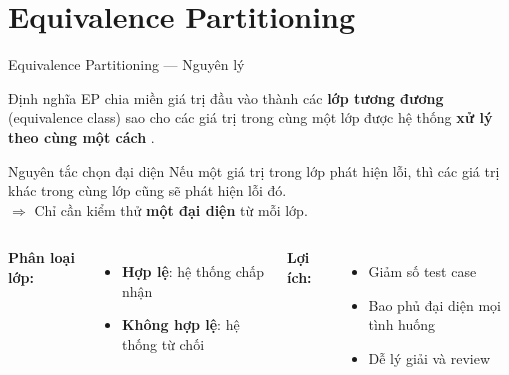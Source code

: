 \documentclass[aspectratio=169,12pt]{beamer}
\begin{document}
\section{Equivalence Partitioning}

\begin{frame}[shrink=10]{Equivalence Partitioning --- Nguyên lý}
  \begin{block}{Định nghĩa}
    EP chia miền giá trị đầu vào thành các \textbf{lớp tương đương}
    (equivalence class) sao cho các giá trị trong cùng một lớp
    được hệ thống \textbf{xử lý theo cùng một cách} \cite{istqb-ctfl,myers-testing}.
  \end{block}

  \vspace{0.2em}
  \begin{block}{Nguyên tắc chọn đại diện}
    Nếu một giá trị trong lớp phát hiện lỗi, thì các giá trị khác
    trong cùng lớp cũng sẽ phát hiện lỗi đó.\\[0.1em]
    $\Rightarrow$ Chỉ cần kiểm thử \textbf{một đại diện} từ mỗi lớp.
  \end{block}

  \vspace{0.15em}
  \small
  \begin{columns}[T,totalwidth=\textwidth]
    \textbf{Phân loại lớp:}
    \begin{itemize}
      \item \textbf{Hợp lệ}: hệ thống chấp nhận
      \item \textbf{Không hợp lệ}: hệ thống từ chối
    \end{itemize}

    \textbf{Lợi ích:}
    \begin{itemize}
      \item Giảm số test case
      \item Bao phủ đại diện mọi tình huống
      \item Dễ lý giải và review
    \end{itemize}
  \end{columns}
\end{frame}
\end{document}
